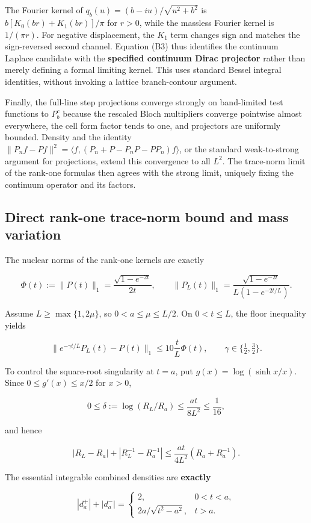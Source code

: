 \documentclass[
  10pt,
  a4paper,
]{article}
\begin{document}
The Fourier kernel of \(q_b(u)=(b-iu)/\sqrt{u^2+b^2}\) is \(b[K_0(br)+K_1(br)]/\pi\) for \(r>0\), while the massless Fourier kernel is \(1/(\pi r)\). For negative displacement, the \(K_1\) term changes sign and matches the sign-reversed second channel. Equation (B3) thus identifies the continuum Laplace candidate with the \textbf{specified continuum Dirac projector} rather than merely defining a formal limiting kernel. This uses standard Bessel integral identities, without invoking a lattice branch-contour argument.

Finally, the full-line step projections converge strongly on band-limited test functions to \(P_b^c\) because the rescaled Bloch multipliers converge pointwise almost everywhere, the cell form factor tends to one, and projectors are uniformly bounded. Density and the identity \(\|P_n f-Pf\|^2=\langle f,(P_n+P- P_nP-PP_n)f\rangle\), or the standard weak-to-strong argument for projections, extend this convergence to all \(L^2\). The trace-norm limit of the rank-one formulas then agrees with the strong limit, uniquely fixing the continuum operator and its factors.

\subsection{Direct rank-one trace-norm bound and mass variation}\label{direct-rank-one-trace-norm-bound-and-mass-variation}

The nuclear norms of the rank-one kernels are exactly

\[
\Phi(t):=\|P(t)\|_1=\frac{\sqrt{1-e^{-2t}}}{2t},\qquad
\|P_L(t)\|_1=\frac{\sqrt{1-e^{-2t}}}{L(1-e^{-2t/L})}.
\]

Assume \(L\ge\max\{1,2\mu\}\), so \(0<a\le\mu\le L/2\). On \(0<t\le L\), the floor inequality yields

\[
\|e^{-\gamma t/L}P_L(t)-P(t)\|_1\le10\frac tL\Phi(t),\qquad
\gamma\in\{\tfrac12,\tfrac32\}.
\]

To control the square-root singularity at \(t=a\), put \(g(x)=\log(\sinh x/x)\). Since \(0\le g'(x)\le x/2\) for \(x>0\),

\[
0\le\delta:=\log(R_L/R_a)\le\frac{at}{8L^2}\le\frac1{16},
\]

and hence

\[
|R_L-R_a|+|R_L^{-1}-R_a^{-1}|
\le\frac{at}{4L^2}(R_a+R_a^{-1}).
\]

The essential integrable combined densities are \textbf{exactly}

\[
|d_a^+|+|d_a^-|=
\begin{cases}2,&0<t<a,\\2a/\sqrt{t^2-a^2},&t>a.\end{cases}
\tag{B4}
\]
\end{document}
